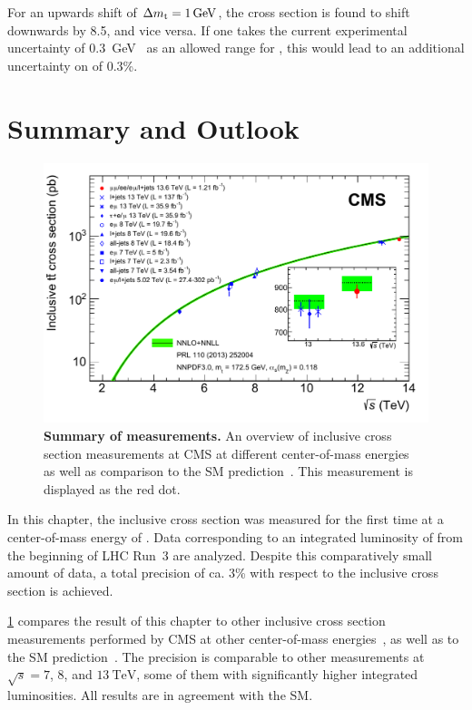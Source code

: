 For an upwards shift of $\Delta \mt = \SI{1}{\GeV}$, the \ttbar cross section is found to shift downwards by \SI{8.5}{\pb}, and vice versa. If one takes the current experimental uncertainty of \SI{0.3}{\GeV}~\cite{PDG:2022pth} as an allowed range for \mt, this would lead to an additional uncertainty on \sigmatt of 0.3\%.

\section{Summary and Outlook}

\begin{figure}[!ht]
    \centering
    \includegraphics[width=0.8\linewidth]{figures/ttxs/tt_curve.pdf}
    \caption{\textbf{Summary of \sigmatt measurements.} An overview of inclusive \ttbar cross section measurements at CMS at different center-of-mass energies~\cite{CMS:TOP-11-007, CMS:TOP-14-018, CMS:TOP-12-006, CMS:TOP-13-004, CMS:TOP-17-001, CMS:TOP-18-005, CMS:TOP-20-001, CMS:TOP-20-004} as well as comparison to the SM prediction~\cite{Czakon:2013goa}. This measurement is displayed as the red dot.}
    \label{fig:ttxs:ttcurve}
\end{figure}

In this chapter, the inclusive \ttbar cross section was measured for the first time at a center-of-mass energy of \sqrtsRIII. Data corresponding to an integrated luminosity of \lumiRIII from the beginning of LHC Run~3 are analyzed. Despite this comparatively small amount of data, a total precision of ca. 3\% with respect to the inclusive cross section is achieved.

\cref{fig:ttxs:ttcurve} compares the result of this chapter to other inclusive \ttbar cross section measurements performed by CMS at other center-of-mass energies~\cite{CMS:TOP-11-007, CMS:TOP-14-018, CMS:TOP-12-006, CMS:TOP-13-004, CMS:TOP-17-001, CMS:TOP-18-005, CMS:TOP-20-001, CMS:TOP-20-004}, as well as to the SM prediction~\cite{Czakon:2013goa}. The precision is comparable to other measurements at $\sqrt{s} = 7$, $8$, and $\SI{13}{\TeV}$, some of them with significantly higher integrated luminosities. All results are in agreement with the SM.


